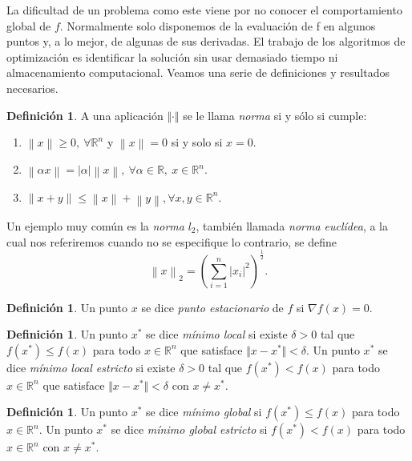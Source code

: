 \documentclass[11pt,a4paper]{book}
\theoremstyle{definition}
\newtheorem{definition}[theorem]{Definición}
\theoremstyle{remark}
\newcommand{\norm}[1]{\left\lVert#1\right\rVert}
\begin{document}
La dificultad de un problema como este viene por no conocer el comportamiento
global de $f$. Normalmente solo disponemos de la evaluación de f en algunos puntos y,
a lo mejor, de algunas de sus derivadas. El trabajo de los algoritmos de
optimización es identificar la solución sin usar demasiado tiempo ni almacenamiento computacional.
Veamos una serie de definiciones y resultados necesarios.
 
\begin{definition}
	A una aplicación $\Vert \cdot \Vert$ se le llama \textit{norma} si y sólo si cumple:
	\vspace{-0.4cm}
	\begin{enumerate}
		\item $\norm{x} \geq 0, \: \forall \mathbb{R}^n$ y $\norm{x}=0$ si y solo si $x=0$.
		\item $\norm{\alpha x} = \vert \alpha \vert \norm{x},\: \forall \alpha \in \mathbb{R},\: x\in \mathbb{R}^n.$
		\item $\norm{x+y} \leq \norm{x} + \norm{y}, \forall x,y \in \mathbb{R}^n$.
	\end{enumerate}
\end{definition}

Un ejemplo muy común es la
\textit{norma} $l_2$, también llamada \textit{norma euclídea}, a la cual nos referiremos cuando no se especifique lo contrario, se define
\begin{equation}
		\norm{x}_2 = \left( \sum_{i=1}^n \vert x_i \vert^2 \right)^{\frac{1}{2}}.
\end{equation}

\begin{definition}
	Un punto $x$ se dice \textit{punto estacionario} de $f$ si $\nabla f(x) = 0$.
\end{definition}

\begin{definition}
	Un punto $x^*$ se dice \textit{mínimo local} si existe $\delta > 0$ tal que $f(x^*) \leq f(x)$ para todo $x \in \mathbb{R}^n$ que satisface $\Vert x - x^* \Vert < \delta$.
	Un punto $x^*$ se dice \textit{mínimo local estricto} si existe $\delta > 0$ tal que $f(x^*) < f(x)$ para todo $x \in \mathbb{R}^n$ que satisface $\Vert x - x^* \Vert < \delta$ con $x \neq x^*$.
\end{definition}

\begin{definition}
	Un punto $x^*$ se dice \textit{mínimo global} si $f(x^*) \leq f(x)$ para todo $x \in \mathbb{R}^n$.
	Un punto $x^*$ se dice \textit{mínimo global estricto} si $f(x^*) < f(x)$ para todo $x \in \mathbb{R}^n$ con $x \neq x^*$.
\end{definition}
\end{document}
